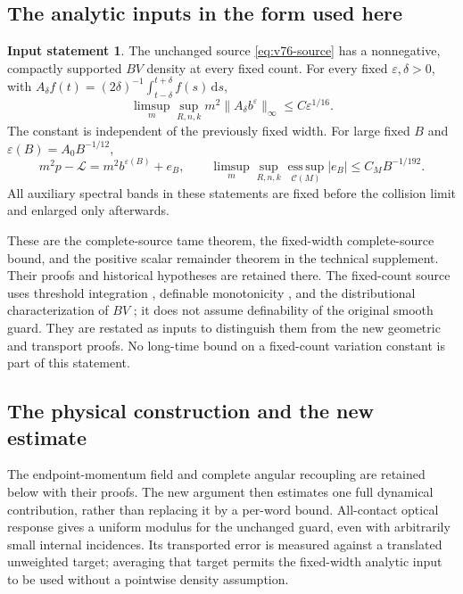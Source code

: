 \documentclass[11pt,reqno]{amsart}
\numberwithin{equation}{section}
\theoremstyle{definition}\newtheorem{definition}[theorem]{Definition}
\theoremstyle{remark}\newtheorem{remark}[theorem]{Remark}
\newcommand{\dd}{\,\mathrm d}\newcommand{\one}{\mathbf1}
\theoremstyle{definition}\newtheorem{inputstatement}[theorem]{Input statement}
\newcommand{\esssup}{\operatorname*{ess\,sup}}
\begin{document}
\subsection{The analytic inputs in the form used here}
\begin{inputstatement}\label{input:v76-analytic}
The unchanged source \eqref{eq:v76-source} has a nonnegative,
compactly supported $BV$ density at every fixed count. For every
fixed $\varepsilon,\delta>0$, with
$A_\delta f(t)=(2\delta)^{-1}\int_{t-\delta}^{t+\delta}f(s)\dd s$,
\begin{equation}\label{eq:v76-average}
 \limsup_m\sup_{R,n,k}m^2\|A_\delta b^\varepsilon\|_\infty
                                      \le C\varepsilon^{1/16}.
\end{equation}
The constant is independent of the previously fixed width. For large
fixed $B$ and $\varepsilon(B)=A_0B^{-1/12}$,
\begin{equation}\label{eq:v76-remainder}
 m^2p-\mathcal L=m^2b^{\varepsilon(B)}+e_B,\qquad
 \limsup_m\sup_{R,n,k}\esssup_{\mathcal C(M)}|e_B|
                                     \le C_MB^{-1/192}.
\end{equation}
All auxiliary spectral bands in these statements are fixed before
the collision limit and enlarged only afterwards.
\end{inputstatement}
These are the complete-source tame theorem, the fixed-width
complete-source bound, and the positive scalar remainder theorem in
the technical supplement. Their proofs and historical hypotheses are
retained there. The fixed-count source uses threshold integration
\cite{CMInt}, definable monotonicity \cite{Coste}, and the
distributional characterization of $BV$ \cite{AFP}; it does not
assume definability of the original smooth guard. They are restated as inputs to distinguish them from
the new geometric and transport proofs. No long-time bound on a
fixed-count variation constant is part of this statement.


\subsection{The physical construction and the new estimate}
The endpoint-momentum field and complete angular recoupling are
retained below with their proofs. The new argument then estimates
one full dynamical contribution, rather than replacing it by a
per-word bound. All-contact optical response gives a uniform modulus
for the unchanged guard, even with arbitrarily small internal
incidences. Its transported error is measured against a translated
unweighted target; averaging that target permits the fixed-width
analytic input to be used without a pointwise density assumption.
\end{document}
